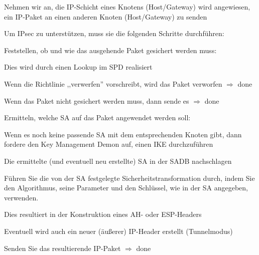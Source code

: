 \documentclass[a4paper]{article}
\begin{document}
\begin{multicols}{3}
      \begin{itemize*}
            \item Nehmen wir an, die IP-Schicht eines Knotens (Host/Gateway) wird
            angewiesen, ein IP-Paket an einen anderen Knoten (Host/Gateway) zu
            senden
            \item Um IPsec zu unterstützen, muss sie die folgenden Schritte durchführen:
            \begin{itemize*}
                  \item Feststellen, ob und wie das ausgehende Paket gesichert werden muss:
                  \begin{itemize*}
                        \item Dies wird durch einen Lookup im SPD realisiert
                        \item Wenn die Richtlinie ,,verwerfen'' vorschreibt, wird das Paket verworfen $\Rightarrow$ done
                        \item Wenn das Paket nicht gesichert werden muss, dann sende es $\Rightarrow$ done
                  \end{itemize*}
                  \item Ermitteln, welche SA auf das Paket angewendet werden soll:
                  \begin{itemize*} \item Wenn es noch keine passende SA mit dem entsprechenden Knoten gibt, dann fordere den Key Management Demon auf, einen IKE durchzuführen \end{itemize*}
                  \item Die ermittelte (und eventuell neu erstellte) SA in der SADB nachschlagen
                  \item Führen Sie die von der SA festgelegte Sicherheitstransformation durch, indem Sie den Algorithmus, seine Parameter und den Schlüssel, wie in der SA angegeben, verwenden.
                  \begin{itemize*}
                        \item Dies resultiert in der Konstruktion eines AH- oder ESP-Headers
                        \item Eventuell wird auch ein neuer (äußerer) IP-Header erstellt (Tunnelmodus)
                  \end{itemize*}
                  \item Senden Sie das resultierende IP-Paket $\Rightarrow$ done
            \end{itemize*}
      \end{itemize*}



\end{multicols}
\end{document}
